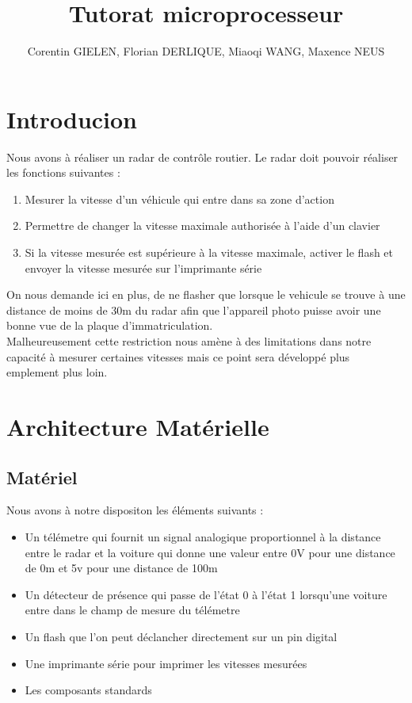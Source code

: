 \documentclass[a4paper, 12pt]{article}
\begin{document}
	\title{Tutorat microprocesseur}
	\author{Corentin GIELEN, Florian DERLIQUE, Miaoqi WANG, Maxence NEUS}
	\maketitle
	
	\newpage
	\tableofcontents
	\newpage
	
	\section{Introducion}
		Nous avons à réaliser un radar de contrôle routier.
		Le radar doit pouvoir réaliser les fonctions suivantes :
		\begin{enumerate}
			\item Mesurer la vitesse d'un véhicule qui entre dans sa zone d'action
			\item Permettre de changer la vitesse maximale authorisée à l'aide d'un clavier
			\item Si la vitesse mesurée est supérieure à la vitesse maximale, activer le flash et envoyer la vitesse mesurée sur l'imprimante série
		\end{enumerate}
	
		On nous demande ici en plus, de ne flasher que lorsque le vehicule se trouve à une distance de moins de 30m du radar afin que l'appareil photo puisse avoir une bonne vue de la plaque d'immatriculation.\\
		Malheureusement cette restriction nous amène à des limitations dans notre capacité à mesurer certaines vitesses mais ce point sera développé plus emplement plus loin.
		
	\newpage
	\section{Architecture Matérielle}
		\subsection{Matériel}
		Nous avons à notre dispositon les éléments suivants :
		\begin{itemize}
			\item Un télémetre qui fournit un signal analogique proportionnel à la distance entre le radar et la voiture
			qui donne une valeur entre 0V pour une distance de 0m et 5v pour une distance de 100m
			\item Un détecteur de présence qui passe de l'état 0 à l'état 1 lorsqu'une voiture entre dans le champ de mesure du télémetre
			\item Un flash que l'on peut déclancher directement sur un pin digital
			\item Une imprimante série pour imprimer les vitesses mesurées
			\item Les composants standards
		\end{itemize}	
\end{document}
